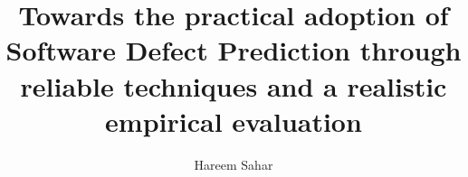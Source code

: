 \documentclass[12pt]{report}          %
\title{Towards the practical adoption of Software Defect Prediction through reliable techniques and a realistic empirical evaluation } %
\author{Hareem Sahar}
\newcommand{\onlyinsubfile}[1]{#1}
\newcommand{\notinsubfile}[1]{}
\begin{document}
\renewcommand{\onlyinsubfile}[1]{}
\renewcommand{\notinsubfile}[1]{#1}

\preamblepagenumbering %
\titlepage %



\doublespacing









\singlespacing %
               
\tableofcontents
\listoftables  %
\listoffigures %

               
\printnoidxglossaries
               
\doublespacing
\end{document}
